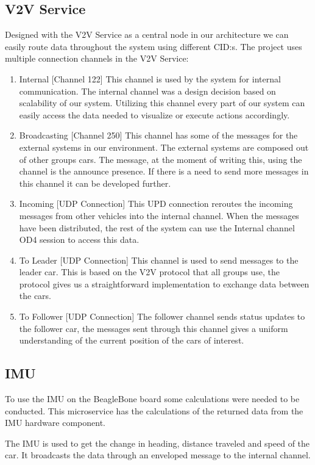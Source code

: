 \documentclass[12pt]{article}
\begin{document}
\subsection{V2V Service}
Designed with the V2V Service as a central node in our architecture we can easily route data throughout the system using different CID:s. The project uses multiple connection channels in the V2V Service:
\begin{enumerate}
\item Internal [Channel 122]
This channel is used by the system for internal communication. The internal channel was a design decision based on scalability of our system. Utilizing this channel every part of our system can easily access the data needed to visualize or execute actions accordingly.
\item Broadcasting [Channel 250]
This channel has some of the messages for the external systems in our environment. The external systems are composed out of other groups cars.  The message, at the moment of writing this,  using the channel is the announce presence. If there is a need to send more messages in this channel it can be developed further.
\item Incoming [UDP Connection]
This UPD connection reroutes the incoming messages from other vehicles into the internal channel. When the messages have been distributed, the rest of the system can use the Internal channel OD4 session to access this data. 
\item To Leader [UDP Connection]
This channel is used to send messages to the leader car. This is based on the V2V protocol that all groups use, the protocol gives us a straightforward implementation to exchange data between the cars. 
\item To Follower [UDP Connection]
The follower channel sends status updates to the follower car, the messages sent through this channel gives a uniform understanding of the current position of the cars of interest. 
\end{enumerate}

\subsection{IMU}
To use the IMU on the BeagleBone board some calculations were needed to be conducted. This microservice has the calculations of the returned data from the IMU hardware component.  

The IMU is used to get the change in heading, distance traveled and speed of the car. It broadcasts the data through an enveloped message to the internal channel. 
\end{document}
